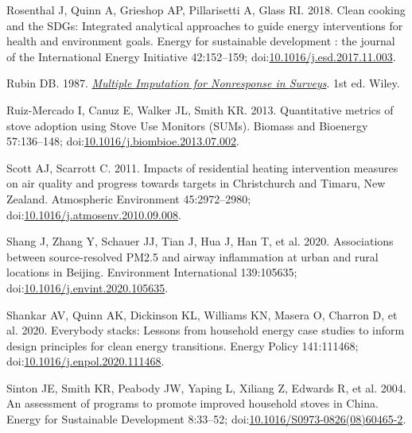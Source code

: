 \documentclass[
  letterpaper,
  DIV=11,
  numbers=noendperiod]{scrartcl}
\newlength{\cslhangindent}
\newlength{\cslentryspacingunit} %
\newenvironment{CSLReferences}[2] %
 {%
  \setlength{\parindent}{0pt}
  \ifodd #1
  \let\oldpar\par
  \def\par{\hangindent=\cslhangindent\oldpar}
  \fi
  \setlength{\parskip}{#2\cslentryspacingunit}
 }%
 {}
\begin{document}
\begin{CSLReferences}{1}{0}
\leavevmode{}%
Rosenthal J, Quinn A, Grieshop AP, Pillarisetti A, Glass RI. 2018. Clean
cooking and the {SDGs}: {Integrated} analytical approaches to guide
energy interventions for health and environment goals. Energy for
sustainable development : the journal of the International Energy
Initiative 42:152--159;
doi:\href{https://doi.org/10.1016/j.esd.2017.11.003}{10.1016/j.esd.2017.11.003}.

\leavevmode{}%
Rubin DB. 1987.
\emph{\href{https://doi.org/10.1002/9780470316696}{Multiple {Imputation}
for {Nonresponse} in {Surveys}}}. 1st ed. Wiley.

\leavevmode{}%
Ruiz-Mercado I, Canuz E, Walker JL, Smith KR. 2013. Quantitative metrics
of stove adoption using {Stove Use Monitors} ({SUMs}). Biomass and
Bioenergy 57:136--148;
doi:\href{https://doi.org/10.1016/j.biombioe.2013.07.002}{10.1016/j.biombioe.2013.07.002}.

\leavevmode{}%
Scott AJ, Scarrott C. 2011. Impacts of residential heating intervention
measures on air quality and progress towards targets in {Christchurch}
and {Timaru}, {New Zealand}. Atmospheric Environment 45:2972--2980;
doi:\href{https://doi.org/10.1016/j.atmosenv.2010.09.008}{10.1016/j.atmosenv.2010.09.008}.

\leavevmode{}%
Shang J, Zhang Y, Schauer JJ, Tian J, Hua J, Han T, et al. 2020.
Associations between source-resolved {PM2}.5 and airway inflammation at
urban and rural locations in {Beijing}. Environment International
139:105635;
doi:\href{https://doi.org/10.1016/j.envint.2020.105635}{10.1016/j.envint.2020.105635}.

\leavevmode{}%
Shankar AV, Quinn AK, Dickinson KL, Williams KN, Masera O, Charron D, et
al. 2020. Everybody stacks: {Lessons} from household energy case studies
to inform design principles for clean energy transitions. Energy Policy
141:111468;
doi:\href{https://doi.org/10.1016/j.enpol.2020.111468}{10.1016/j.enpol.2020.111468}.

\leavevmode{}%
Sinton JE, Smith KR, Peabody JW, Yaping L, Xiliang Z, Edwards R, et al.
2004. An assessment of programs to promote improved household stoves in
{China}. Energy for Sustainable Development 8:33--52;
doi:\href{https://doi.org/10.1016/S0973-0826(08)60465-2}{10.1016/S0973-0826(08)60465-2}.


\end{CSLReferences}
\end{document}
